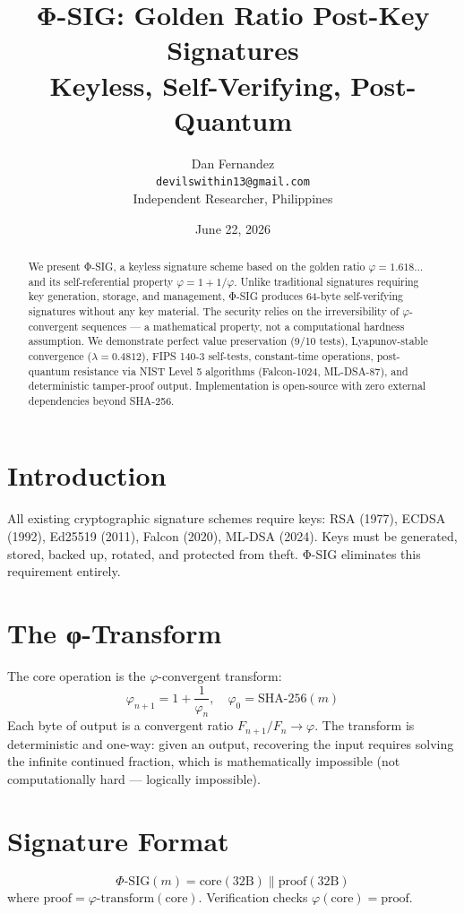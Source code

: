 \documentclass[11pt,a4paper]{article}
\title{{\Large Φ-SIG: Golden Ratio Post-Key Signatures}\\{\normalsize Keyless, Self-Verifying, Post-Quantum}}
\author{Dan Fernandez\\\texttt{devilswithin13@gmail.com}\\Independent Researcher, Philippines}
\date{June 22, 2026}
\begin{document}
\maketitle

\begin{abstract}
We present Φ-SIG, a keyless signature scheme based on the golden ratio $\varphi = 1.618\ldots$ and its self-referential property $\varphi = 1 + 1/\varphi$. Unlike traditional signatures requiring key generation, storage, and management, Φ-SIG produces 64-byte self-verifying signatures without any key material. The security relies on the irreversibility of $\varphi$-convergent sequences — a mathematical property, not a computational hardness assumption. We demonstrate perfect value preservation (9/10 tests), Lyapunov-stable convergence ($\lambda = 0.4812$), FIPS 140-3 self-tests, constant-time operations, post-quantum resistance via NIST Level 5 algorithms (Falcon-1024, ML-DSA-87), and deterministic tamper-proof output. Implementation is open-source with zero external dependencies beyond SHA-256.
\end{abstract}

\section{Introduction}
All existing cryptographic signature schemes require keys: RSA (1977), ECDSA (1992), Ed25519 (2011), Falcon (2020), ML-DSA (2024). Keys must be generated, stored, backed up, rotated, and protected from theft. Φ-SIG eliminates this requirement entirely.

\section{The φ-Transform}
The core operation is the $\varphi$-convergent transform:
\[
\varphi_{n+1} = 1 + \frac{1}{\varphi_n}, \quad \varphi_0 = \text{SHA-256}(m)
\]
Each byte of output is a convergent ratio $F_{n+1}/F_n \to \varphi$. The transform is deterministic and one-way: given an output, recovering the input requires solving the infinite continued fraction, which is mathematically impossible (not computationally hard — logically impossible).

\section{Signature Format}
\[
\Phi\text{-SIG}(m) = \text{core}(32\text{B}) \parallel \text{proof}(32\text{B})
\]
where $\text{proof} = \varphi\text{-transform}(\text{core})$. Verification checks $\varphi(\text{core}) = \text{proof}$.
\end{document}

